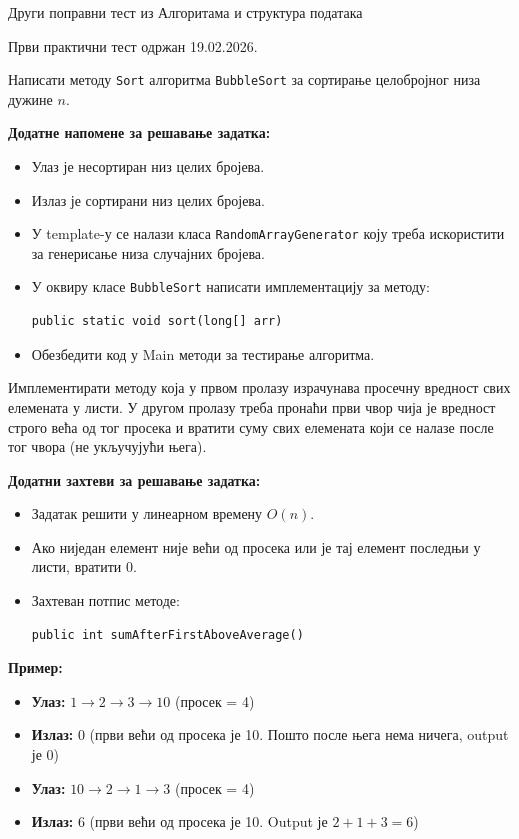 
Други поправни тест из Алгоритама и структура података

Први практични тест одржан 19.02.2026.

Написати методу \texttt{Sort} алгоритма \texttt{BubbleSort} за сортирање целобројног низа дужине $n$.

\textbf{Додатне напомене за решавање задатка:}
\begin{itemize}
	\item Улаз је несортиран низ целих бројева.
	\item Излаз је сортирани низ целих бројева.
	\item У template-у се налази класа \texttt{RandomArrayGenerator} коју треба искористити за генерисање низа случајних бројева.
	\item У оквиру класе \texttt{BubbleSort} написати имплементацију за методу:
	\begin{Verbatim}[fontsize=\small]
public static void sort(long[] arr)
	\end{Verbatim}
	\item Обезбедити код у Main методи за тестирање алгоритма.
\end{itemize}

Имплементирати методу која у првом пролазу израчунава просечну вредност свих елемената у листи. У другом пролазу треба пронаћи први чвор чија је вредност строго већа од тог просека и вратити суму свих елемената који се налазе после тог чвора (не укључујући њега).

\textbf{Додатни захтеви за решавање задатка:}
\begin{itemize}
	\item Задатак решити у линеарном времену $O(n)$.
	\item Ако ниједан елемент није већи од просека или је тај елемент последњи у листи, вратити 0.
	\item Захтеван потпис методе:
	\begin{Verbatim}[fontsize=\small]
public int sumAfterFirstAboveAverage()
	\end{Verbatim}
\end{itemize}

\textbf{Пример:}
\begin{itemize}
	\item \textbf{Улаз:} $1 \rightarrow 2 \rightarrow 3 \rightarrow 10$ (просек = 4)
	\item \textbf{Излаз:} $0$ (први већи од просека је 10. Пошто после њега нема ничега, output је 0)
	\item \textbf{Улаз:} $10 \rightarrow 2 \rightarrow 1 \rightarrow 3$ (просек = 4)
	\item \textbf{Излаз:} $6$ (први већи од просека је 10. Output је $2 + 1 + 3 = 6$)
\end{itemize}

